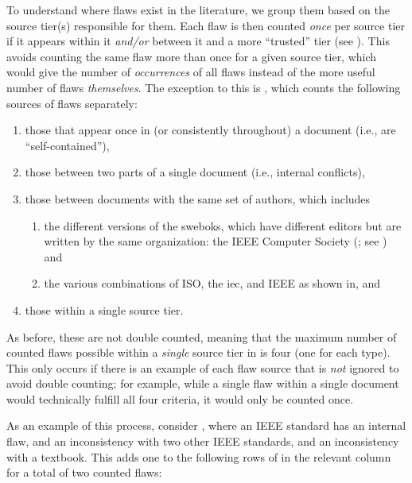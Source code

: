 To understand where flaws exist in the literature, we group them based on the
source tier(s) responsible for them. Each flaw is then counted \emph{once} per
source tier if it appears within it \emph{and/or} between it and a more
``trusted'' tier (see ). This avoids counting the same flaw
more than once for a given
source tier, which would give the number of \emph{occurrences}
of all flaws instead of the more useful number of flaws \emph{themselves}. The
exception to this is , which counts the following sources
of flaws separately:
\begin{enumerate}
    \item those that appear once in (or consistently throughout) a document
          (i.e., are ``self-contained''),
    \item those between two parts of a single document
          (i.e., internal conflicts),
    \item those between documents with the same set of authors, which includes
          \begin{enumerate}
              \item the different versions of the \acfp{swebok}, which have
                    different editors \citep{SWEBOK2024,SWEBOK2014} but are
                    written by the same organization: the IEEE Computer Society
                    (\citealp{AboutSWEBOK}; see ) and
              \item the various combinations of ISO, the \acf{iec}, and IEEE as
                    shown in, and
          \end{enumerate}
    \item those within a single source tier.
\end{enumerate}
As before, these are not double counted, meaning that the maximum number of
counted flaws possible within a \emph{single} source tier in
 is four (one for each type). This only occurs if
there is an example of each flaw source that is \emph{not} ignored to
avoid double counting; for example, while a single flaw within a single
document would technically fulfill all four criteria, it would only be counted
once.

\label{flaw-analysis-example}
As an example of this process, consider , where an
IEEE standard has an internal flaw, and an inconsistency with two other IEEE
standards, and an inconsistency with a textbook. This adds one to the following
rows of  in the relevant column for a total
of two counted flaws:

